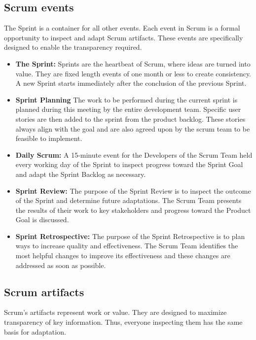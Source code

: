 \subsection{Scrum events}
The Sprint is a container for all other events. Each event in Scrum is a formal opportunity to inspect 
and adapt Scrum artifacts. These events are specifically designed to enable the transparency required.

\begin{itemize}
    \item \textbf{The Sprint:} Sprints are the heartbeat of Scrum, where ideas are turned into value. 
    They are fixed length events of one month or less to create consistency. A new Sprint starts 
    immediately after the conclusion of the previous Sprint.
    \item \textbf{Sprint Planning} The work to be performed during the current sprint is planned during 
    this meeting by the entire development team. Specific user stories are then added to the sprint from 
    the product backlog. These stories always align with the goal and are also agreed upon by the scrum 
    team to be feasible to implement.
    \item \textbf{Daily Scrum:} A 15-minute event for the Developers of the Scrum Team 
    held every working day of the Sprint to inspect progress toward the Sprint Goal and adapt the Sprint
    Backlog as necessary.
    \item \textbf{Sprint Review:} The purpose of the Sprint Review is to inspect the outcome of the 
    Sprint and determine future adaptations. The Scrum Team presents the results of their work to key 
    stakeholders and progress toward the Product Goal is discussed.
    \item \textbf{Sprint Retrospective:} The purpose of the Sprint Retrospective is to plan ways to 
    increase quality and effectiveness. The Scrum Team identifies the most helpful changes to improve 
    its effectiveness and these changes are addressed as soon as possible.
\end{itemize}


\subsection{Scrum artifacts}
Scrum’s artifacts represent work or value. They are designed to maximize transparency of key information. 
Thus, everyone inspecting them has the same basis for adaptation.

